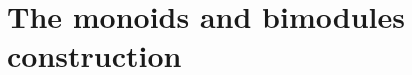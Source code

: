 \documentclass[12pt,oneside,article,draft]{memoir}
\begin{document}



\section{The monoids and bimodules construction}
\end{document}
